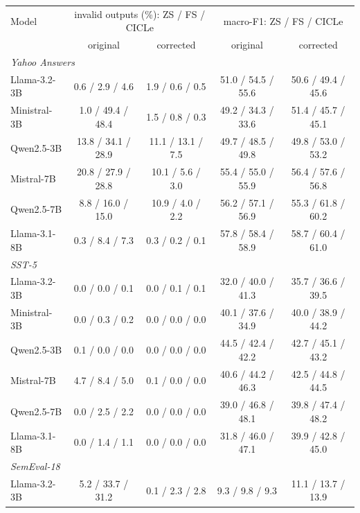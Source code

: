 \begin{tabular}{lcccc}
\toprule
Model & \multicolumn{2}{c}{invalid outputs (\%): ZS / FS / CICLe} & \multicolumn{2}{c}{macro-F1: ZS / FS / CICLe} \\
 & original & corrected & original & corrected \\
\midrule
\multicolumn{5}{l}{\emph{Yahoo Answers}} \\
Llama-3.2-3B & 0.6 / 2.9 / 4.6 & 1.9 / 0.6 / 0.5 & 51.0 / 54.5 / 55.6 & 50.6 / 49.4 / 45.6 \\
Ministral-3B & 1.0 / 49.4 / 48.4 & 1.5 / 0.8 / 0.3 & 49.2 / 34.3 / 33.6 & 51.4 / 45.7 / 45.1 \\
Qwen2.5-3B & 13.8 / 34.1 / 28.9 & 11.1 / 13.1 / 7.5 & 49.7 / 48.5 / 49.8 & 49.8 / 53.0 / 53.2 \\
Mistral-7B & 20.8 / 27.9 / 28.8 & 10.1 / 5.6 / 3.0 & 55.4 / 55.0 / 55.9 & 56.4 / 57.6 / 56.8 \\
Qwen2.5-7B & 8.8 / 16.0 / 15.0 & 10.9 / 4.0 / 2.2 & 56.2 / 57.1 / 56.9 & 55.3 / 61.8 / 60.2 \\
Llama-3.1-8B & 0.3 / 8.4 / 7.3 & 0.3 / 0.2 / 0.1 & 57.8 / 58.4 / 58.9 & 58.7 / 60.4 / 61.0 \\
\midrule
\multicolumn{5}{l}{\emph{SST-5}} \\
Llama-3.2-3B & 0.0 / 0.0 / 0.1 & 0.0 / 0.1 / 0.1 & 32.0 / 40.0 / 41.3 & 35.7 / 36.6 / 39.5 \\
Ministral-3B & 0.0 / 0.3 / 0.2 & 0.0 / 0.0 / 0.0 & 40.1 / 37.6 / 34.9 & 40.0 / 38.9 / 44.2 \\
Qwen2.5-3B & 0.1 / 0.0 / 0.0 & 0.0 / 0.0 / 0.0 & 44.5 / 42.4 / 42.2 & 42.7 / 45.1 / 43.2 \\
Mistral-7B & 4.7 / 8.4 / 5.0 & 0.1 / 0.0 / 0.0 & 40.6 / 44.2 / 46.3 & 42.5 / 44.8 / 44.5 \\
Qwen2.5-7B & 0.0 / 2.5 / 2.2 & 0.0 / 0.0 / 0.0 & 39.0 / 46.8 / 48.1 & 39.8 / 47.4 / 48.2 \\
Llama-3.1-8B & 0.0 / 1.4 / 1.1 & 0.0 / 0.0 / 0.0 & 31.8 / 46.0 / 47.1 & 39.9 / 42.8 / 45.0 \\
\midrule
\multicolumn{5}{l}{\emph{SemEval-18}} \\
Llama-3.2-3B & 5.2 / 33.7 / 31.2 & 0.1 / 2.3 / 2.8 & 9.3 / 9.8 / 9.3 & 11.1 / 13.7 / 13.9 \\

\end{tabular}
